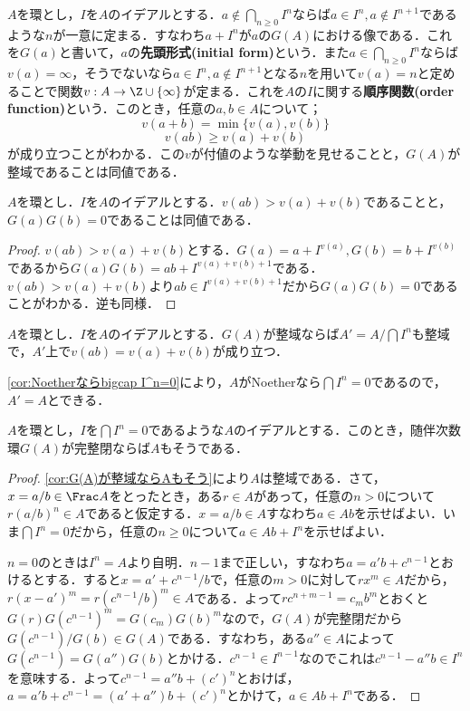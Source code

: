 $A$を環とし，$I$を$A$のイデアルとする．$a\not\in\bigcap_{n\geq 0}I^n$ならば$a\in I^n,a\not\in I^{n+1}$であるような$n$が一意に定まる．すなわち$a+I^n$が$a$の$G(A)$における像である．これを$G(a)$と書いて，$a$の\textbf{先頭形式(initial form)}という．また$a\in\bigcap_{n\geq0}I^n$ならば$v(a)=\infty$，そうでないなら$a\in I^n,a\not\in I^{n+1}$となる$n$を用いて$v(a)=n$と定めることで関数$v:A\to\Z\cup\{\infty\}$が定まる．これを$A$の$I$に関する\textbf{順序関数(order function)}という．このとき，任意の$a,b\in A$について；
\[v(a+b)=\min\{v(a),v(b)\}\]
\[v(ab)\geq v(a)+v(b)\]
が成り立つことがわかる．この$v$が付値のような挙動を見せることと，$G(A)$が整域であることは同値である．

\begin{lem}
	$A$を環とし．$I$を$A$のイデアルとする．$v(ab)>v(a)+v(b)$であることと，$G(a)G(b)=0$であることは同値である．
\end{lem}

\begin{proof}
	$v(ab)>v(a)+v(b)$とする．$G(a)=a+I^{v(a)},G(b)=b+I^{v(b)}$であるから$G(a)G(b)=ab+I^{v(a)+v(b)+1}$である．$v(ab)>v(a)+v(b)$より$ab\in I^{v(a)+v(b)+1}$だから$G(a)G(b)=0$であることがわかる．逆も同様．
\end{proof}
\begin{cor}\label{cor:G(A)が整域ならAもそう}
	$A$を環とし．$I$を$A$のイデアルとする．$G(A)$が整域ならば$A'=A/\bigcap I^n$も整域で，$A'$上で$v(ab)=v(a)+v(b)$が成り立つ．
\end{cor}

\ref{cor:Noetherならbigcap I^n=0}により，$A$がNoetherなら$\bigcap I^n=0$であるので，$A'=A$とできる．

\begin{thm}
	$A$を環とし，$I$を$\bigcap I^n=0$であるような$A$のイデアルとする．このとき，随伴次数環$G(A)$が完整閉ならば$A$もそうである．
\end{thm}

\begin{proof}
	\ref{cor:G(A)が整域ならAもそう}により$A$は整域である．さて，$x=a/b\in\Frac A$をとったとき，ある$r\in A$があって，任意の$n>0$について$r(a/b)^n\in A$であると仮定する．$x=a/b\in A$すなわち$a\in Ab$を示せばよい．いま$\bigcap I^n=0$だから，任意の$n\geq 0$について$a\in Ab+I^n$を示せばよい．
	
	$n=0$のときは$I^n=A$より自明．$n-1$まで正しい，すなわち$a=a'b+c^{n-1}$とおけるとする．すると$x=a'+c^{n-1}/b$で，任意の$m>0$に対して$rx^m\in A$だから，$r(x-a')^m=r(c^{n-1}/b)^m\in A$である．よって$rc^{n+m-1}=c_mb^m$とおくと$G(r)G(c^{n-1})^m=G(c_m)G(b)^m$なので，$G(A)$が完整閉だから$G(c^{n-1})/G(b)\in G(A)$である．すなわち，ある$a''\in A$によって$G(c^{n-1})=G(a'')G(b)$とかける．$c^{n-1}\in I^{n-1}$なのでこれは$c^{n-1}-a''b\in I^n$を意味する．よって$c^{n-1}=a''b+(c')^n$とおけば，$a=a'b+c^{n-1}=(a'+a'')b+(c')^n$とかけて，$a\in Ab+I^n$である．
\end{proof}

